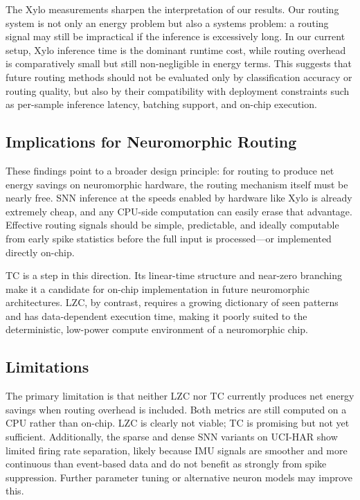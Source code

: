 \documentclass[conference]{IEEEtran}
\begin{document}
The Xylo measurements sharpen the interpretation of our results. Our routing system is not only an energy problem but also a systems problem: a routing signal may still be impractical if the inference is excessively long. In our current setup, Xylo inference time is the dominant runtime cost, while routing overhead is comparatively small but still non-negligible in energy terms. This suggests that future routing methods should not be evaluated only by classification accuracy or routing quality, but also by their compatibility with deployment constraints such as per-sample inference latency, batching support, and on-chip execution.

\subsection{Implications for Neuromorphic Routing}

These findings point to a broader design principle: for routing to produce net energy savings on neuromorphic hardware, the routing mechanism itself must be nearly free. SNN inference at the speeds enabled by hardware like Xylo is already extremely cheap, and any CPU-side computation can easily erase that advantage. Effective routing signals should be simple, predictable, and ideally computable from early spike statistics before the full input is processed—or implemented directly on-chip.

TC is a step in this direction. Its linear-time structure and near-zero branching make it a candidate for on-chip implementation in future neuromorphic architectures. LZC, by contrast, requires a growing dictionary of seen patterns and has data-dependent execution time, making it poorly suited to the deterministic, low-power compute environment of a neuromorphic chip.

\subsection{Limitations}

The primary limitation is that neither LZC nor TC currently produces net energy savings when routing overhead is included. Both metrics are still computed on a CPU rather than on-chip. LZC is clearly not viable; TC is promising but not yet sufficient. Additionally, the sparse and dense SNN variants on UCI-HAR show limited firing rate separation, likely because IMU signals are smoother and more continuous than event-based data and do not benefit as strongly from spike suppression. Further parameter tuning or alternative neuron models may improve this.
\end{document}
